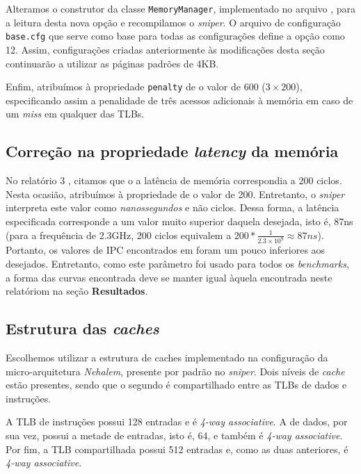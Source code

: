 \documentclass[12pt]{article}
\begin{document}
Alteramos o construtor da classe \texttt{MemoryManager}, implementado
no arquivo , para a leitura desta nova opção e
recompilamos o \textit{sniper}. O arquivo de configuração \texttt{base.cfg} que
serve como base para todas as configurações define a opção 
como 12. Assim, configurações criadas anteriormente às modificações desta
seção continuarão a utilizar as páginas padrões de 4KB.

Enfim, atribuímos à propriedade \texttt{penalty} de  o
valor de 600 (\(3\times 200\)), especificando assim a penalidade de três acessos
adicionais à memória em caso de um \textit{miss} em qualquer das TLBs.

\subsection{Correção na propriedade \textit{latency} da memória}

No relatório 3 \cite{relatorio3}, citamos que o a latência de memória
correspondia a 200 ciclos. Nesta ocasião, atribuímos à propriedade
 de  o valor de 200. Entretanto, o
\textit{sniper} interpreta este valor como \textit{nanossegundos} e não ciclos.
Dessa forma, a latência especificada corresponde a um valor muito superior
daquela desejada, isto é, 87ns (para a frequência de 2.3GHz, 200 ciclos
equivalem a \(200*\frac{1}{2.3\times 10^9} \approx 87ns\)). Portanto, os valores
de IPC encontrados em \cite{relatorio3} foram um pouco inferiores aos desejados.
Entretanto, como este parâmetro foi usado para todos os \textit{benchmarks}, a
forma das curvas encontrada deve se manter igual àquela encontrada neste
relatóriom na seção \textbf{Resultados}.

\subsection{Estrutura das \textit{caches}}

Escolhemos utilizar a estrutura de caches implementado na configuração da
micro-arquitetura \textit{Nehalem}, presente por padrão no \textit{sniper}. Dois
níveis de \textit{cache} estão presentes, sendo que o segundo é compartilhado
entre as TLBs de dados e instruções. 

A TLB de instruções possui 128 entradas e é \textit{4-way associative}. A de
dados, por sua vez, possui a metade de entradas, isto é, 64, e também é
\textit{4-way associative}. Por fim, a TLB compartilhada possui 512 entradas e,
como as duas anteriores, é \textit{4-way associative}. 
\end{document}
